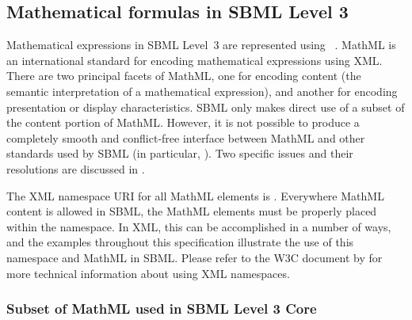 \subsection{Mathematical formulas in SBML Level 3}
\label{sec:formulas}

Mathematical expressions in SBML Level~3 are represented using
\mathmltwo~\citep{w3c:2000b}.  MathML is an international standard
for encoding mathematical expressions using XML.  There are two
principal facets of MathML, one for encoding content (\ie the
semantic interpretation of a mathematical expression), and another
for encoding presentation or display characteristics.  SBML only
makes direct use of a subset of the content portion of MathML.
However, it is not possible to produce a completely smooth and
conflict-free interface between MathML and other standards used by
SBML (in particular, \xmlschema).  Two specific issues and their
resolutions are discussed in .

The XML namespace URI for all MathML elements is
.  Everywhere MathML
content is allowed in SBML, the MathML elements must be properly
placed within the \mathmltwo namespace.  In XML, this can be
accomplished in a number of ways, and the examples throughout this
specification illustrate the use of this namespace and MathML in
SBML.  Please refer to the W3C document by \citet{bray:1999} for
more technical information about using XML namespaces.


\subsubsection{Subset of MathML used in SBML Level 3 Core}
\label{sec:mathmlsubset}


